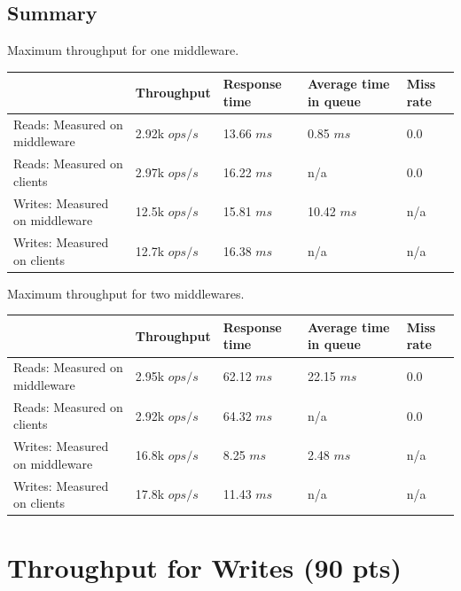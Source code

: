 \documentclass[11pt,a4paper]{article}
\begin{document}
\subsection{Summary}

\begin{center}
	{Maximum throughput for one middleware.}
	\begin{tabular}{|l|p{2cm}|p{2cm}|p{2cm}|p{2cm}|}
		\hline                                & Throughput & Response time & Average time in queue & Miss rate \\ 
		\hline Reads: Measured on middleware  & 2.92k $ops/s$ & 13.66 $ms$ & 0.85 $ms$ & 0.0 \\ 
        \hline Reads: Measured on clients     & 2.97k $ops/s$ & 16.22 $ms$ & n/a  & 0.0 \\ 
        \hline Writes: Measured on middleware & 12.5k $ops/s$ & 15.81 $ms$ & 10.42 $ms$ & n/a       \\ 
        \hline Writes: Measured on clients    & 12.7k $ops/s$ & 16.38 $ms$ & n/a & n/a       \\ 
		\hline 
	\end{tabular}
\end{center}

\begin{center}
	{Maximum throughput for two middlewares.}
	\begin{tabular}{|l|p{2cm}|p{2cm}|p{2cm}|p{2cm}|}
		\hline                                & Throughput & Response time & Average time in queue & Miss rate \\ 
		\hline Reads: Measured on middleware  & 2.95k $ops/s$ & 62.12 $ms$ & 22.15 $ms$            & 0.0       \\ 
		\hline Reads: Measured on clients     & 2.92k $ops/s$ & 64.32 $ms$ & n/a                   & 0.0       \\ 
		\hline Writes: Measured on middleware & 16.8k $ops/s$ & 8.25 $ms$ & 2.48 $ms$             & n/a       \\ 
        \hline Writes: Measured on clients    & 17.8k $ops/s$ & 11.43 $ms$ & n/a                   & n/a       \\ 
		\hline 
	\end{tabular}
\end{center}

\section{Throughput for Writes (90 pts)}
\end{document}
